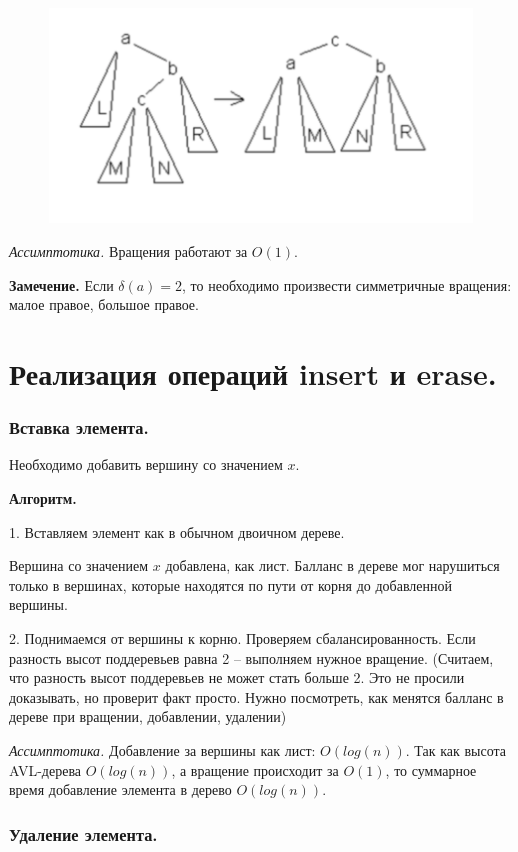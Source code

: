 \begin{figure}[h]
\begin{center}
\includegraphics[width=0.4\linewidth]{images/43-46_avl_maxrotate}
\label{fig:mpr}
\end{center}
\end{figure}

\textit{Ассимптотика.} Вращения работают за $O(1)$.

\textbf{Замечение.} Если $\delta(a) = 2$, то необходимо произвести симметричные вращения: малое правое, большое правое.

\setcounter{section}{45}
\section{Реализация операций insert и erase.}

\subsubsection*{Вставка элемента.}

Необходимо добавить вершину со значением $x$. 

\textbf{Алгоритм.} 

1. Вставляем элемент как в обычном двоичном дереве.

Вершина со значением $x$ добавлена, как лист. Балланс в дереве мог нарушиться только в вершинах, которые находятся по пути от корня до добавленной вершины.

2. Поднимаемся от вершины к корню. Проверяем сбалансированность. Если разность высот поддеревьев равна 2 – выполняем нужное вращение. (Считаем, что разность высот поддеревьев не может стать больше 2. Это не просили доказывать, но проверит факт просто. Нужно посмотреть, как менятся балланс в дереве при вращении, добавлении, удалении)

\textit{Ассимптотика.} Добавление за вершины как лист: $O(log(n))$. Так как высота AVL-дерева $O(log(n))$, а вращение происходит за $O(1)$, то суммарное время добавление элемента в дерево $O(log(n))$. 

\subsubsection*{Удаление элемента.}

